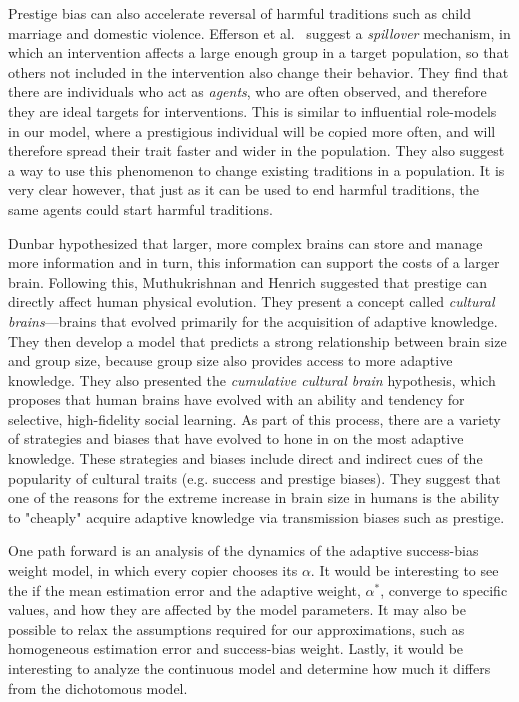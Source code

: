 \documentclass[12pt]{extarticle}
\begin{document}
Prestige bias can also accelerate reversal of harmful traditions such as child marriage and domestic violence. 
{Efferson et al.}\ \citep{harmful_traditions} suggest a \emph{spillover}  mechanism, in which an intervention affects a large enough group in a target population, so that others not included in the intervention also change their behavior.
They {find} that there are individuals who act as \emph{agents}, who are often {observed}, and therefore they are ideal targets for interventions. This is similar to influential role-models in our model, where a prestigious individual will be copied more often, and will therefore spread {their} trait faster and wider in the population.
They also suggest a way to use this {phenomenon} to change existing traditions in a population. It is very clear however, that just as it can be used to end harmful traditions, the same agents could start harmful traditions.


{Dunbar} \citep{social_brains} hypothesized that larger, more complex brains can store and manage more information and in turn, this information can support the costs of a larger brain.
Following {this, Muthukrishnan and Henrich \citep{collective_brains} suggested} that prestige can directly affect human physical evolution. They present a concept called \emph{cultural brains}---brains that evolved primarily for the acquisition of adaptive knowledge.
They then develop a model that predicts a strong relationship between brain size and group size, because group size also provides access to more adaptive knowledge. 
They also presented the \emph{cumulative cultural brain} hypothesis, which proposes that human brains have evolved with an ability and tendency for selective, high-fidelity social learning. As part of this process, there are a variety of strategies and biases that have evolved to hone in on the most adaptive knowledge. These strategies and biases include direct and indirect cues of the popularity of cultural traits (e.g. success and prestige biases).
They suggest that one of the reasons for the extreme increase in brain size in humans is the ability to "cheaply" acquire adaptive knowledge via transmission biases such as prestige.

One path forward is an analysis of the dynamics of the adaptive success-bias weight model, in which every copier chooses its $\alpha$. It would be interesting to see the if the mean estimation error and the adaptive weight, $\alpha^*$, {converge} to specific values, and how they are affected by the model parameters.
It may also be possible to relax the assumptions required for our approximations, such as homogeneous estimation error and success-bias weight.
Lastly, it would be interesting to analyze the continuous model and determine how much it differs from the dichotomous model. 
\end{document}
